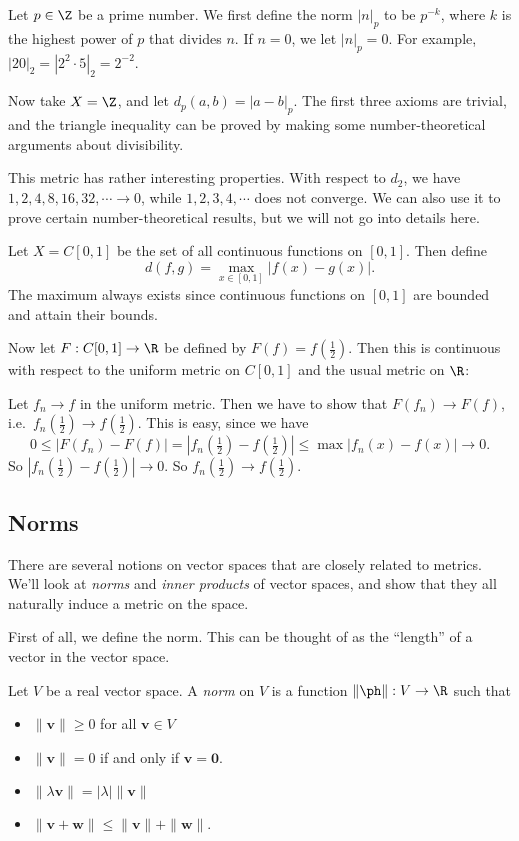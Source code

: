 \documentclass[a4paper]{article}
\begin{document}
\begin{eg}
  Let $p\in \Z$ be a prime number. We first define the norm $|n|_p$ to be $p^{-k}$, where $k$ is the highest power of $p$ that divides $n$. If $n = 0$, we let $|n|_p = 0$. For example, $|20|_2 = |2^2\cdot 5|_2 = 2^{-2}$.

  Now take $X = \Z$, and let $d_p (a, b) = |a - b|_p$. The first three axioms are trivial, and the triangle inequality can be proved by making some number-theoretical arguments about divisibility.

  This metric has rather interesting properties. With respect to $d_2$, we have $1, 2, 4, 8, 16, 32, \cdots \to 0$, while $1, 2, 3, 4, \cdots$ does not converge. We can also use it to prove certain number-theoretical results, but we will not go into details here.
\end{eg}

\begin{eg}
  Let $X = C[0, 1]$ be the set of all continuous functions on $[0, 1]$. Then define
  \[
    d(f, g) = \max_{x\in [0, 1]}|f(x) - g(x)|.
  \]
  The maximum always exists since continuous functions on $[0, 1]$ are bounded and attain their bounds.

  Now let $F: C[0, 1] \to \R$ be defined by $F(f) = f(\frac{1}{2})$. Then this is continuous with respect to the uniform metric on $C[0, 1]$ and the usual metric on $\R$:

  Let $f_n \to f$ in the uniform metric. Then we have to show that $F(f_n) \to F(f)$, i.e.\ $f_n(\frac{1}{2}) \to f(\frac{1}{2})$. This is easy, since we have
  \[
    0 \leq |F(f_n) - F(f)| = |f_n(\tfrac{1}{2}) - f(\tfrac{1}{2})| \leq \max|f_n(x) - f(x)| \to 0.
  \]
  So $|f_n(\frac{1}{2}) - f(\frac{1}{2})| \to 0$. So $f_n(\frac{1}{2}) \to f(\frac{1}{2})$.
\end{eg}

\subsection{Norms}
There are several notions on vector spaces that are closely related to metrics. We'll look at \emph{norms} and \emph{inner products} of vector spaces, and show that they all naturally induce a metric on the space.

First of all, we define the norm. This can be thought of as the ``length'' of a vector in the vector space.
\begin{defi}[Norm]
  Let $V$ be a real vector space. A \emph{norm} on $V$ is a function $\|\ph \|: V\to \R$ such that
  \begin{itemize}
    \item $\|\mathbf{v}\| \geq 0$ for all $\mathbf{v}\in V$
    \item $\|\mathbf{v}\| = 0$ if and only if $\mathbf{v} = \mathbf{0}$.
    \item $\|\lambda \mathbf{v}\| = |\lambda|\|\mathbf{v}\|$
    \item $\|\mathbf{v} + \mathbf{w}\| \leq \|\mathbf{v}\| + \|\mathbf{w}\|$.
  \end{itemize}
\end{defi}
\end{document}
